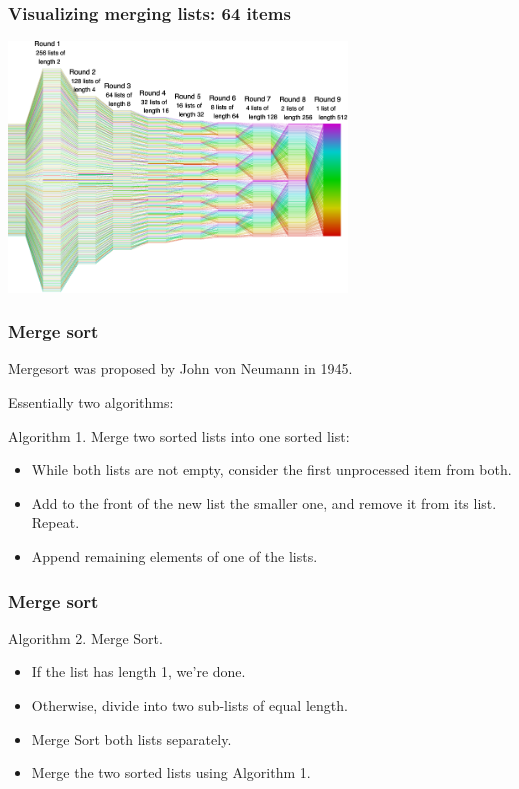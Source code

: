 \documentclass{beamer} %
\begin{document}
\begin{frame}
  \frametitle{Visualizing merging lists: 64 items}
  \centering
  \includegraphics[width=90mm]{assets/mergesort2.pdf}
\end{frame}

\begin{frame}
\frametitle{Merge sort}

Mergesort was proposed by John von Neumann in 1945.

\vspace{3mm}
Essentially two algorithms:

\vspace{5mm}
Algorithm 1. Merge two sorted lists into one sorted list:
\begin{itemize}
\item While both lists are not empty, consider the first unprocessed item from both.
\item Add to the front of the new list the smaller one, and remove it from its list. Repeat.
\item Append remaining elements of one of the lists.
\end{itemize}

\end{frame}

\begin{frame}
\frametitle{Merge sort}

Algorithm 2. Merge Sort.
\begin{itemize}
\item If the list has length 1, we're done.
\item Otherwise, divide into two sub-lists of equal length.
\item Merge Sort both lists separately.
\item Merge the two sorted lists using Algorithm 1.
\end{itemize}

\end{frame}
\end{document}
